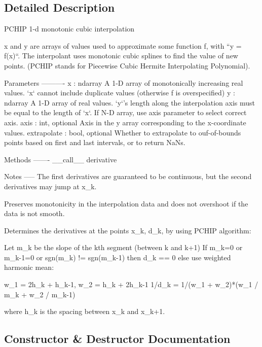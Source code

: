 \subsection{Detailed Description}
\begin{DoxyVerb}PCHIP 1-d monotonic cubic interpolation

x and y are arrays of values used to approximate some function f,
with ``y = f(x)``.  The interpolant uses monotonic cubic splines
to find the value of new points. (PCHIP stands for Piecewise Cubic
Hermite Interpolating Polynomial).

Parameters
----------
x : ndarray
    A 1-D array of monotonically increasing real values.  `x` cannot
    include duplicate values (otherwise f is overspecified)
y : ndarray
    A 1-D array of real values.  `y`'s length along the interpolation
    axis must be equal to the length of `x`. If N-D array, use axis 
    parameter to select correct axis.
axis : int, optional
    Axis in the y array corresponding to the x-coordinate values.
extrapolate : bool, optional
    Whether to extrapolate to ouf-of-bounds points based on first
    and last intervals, or to return NaNs.

Methods
-------
__call__
derivative

Notes
-----
The first derivatives are guaranteed to be continuous, but the second
derivatives may jump at x_k. 

Preserves monotonicity in the interpolation data and does not overshoot
if the data is not smooth.

Determines the derivatives at the points x_k, d_k, by using PCHIP algorithm:
  
Let m_k be the slope of the kth segment (between k and k+1)
If m_k=0 or m_{k-1}=0 or sgn(m_k) != sgn(m_{k-1}) then d_k == 0
else use weighted harmonic mean:

   w_1 = 2h_k + h_{k-1}, w_2 = h_k + 2h_{k-1}
   1/d_k = 1/(w_1 + w_2)*(w_1 / m_k + w_2 / m_{k-1})

where h_k is the spacing between x_k and x_{k+1}.\end{DoxyVerb}
 

\subsection{Constructor \& Destructor Documentation}
\hypertarget{classscipy_1_1interpolate_1_1__monotone_1_1PchipInterpolator_a6b4721e0d8d26176ef866745f25f5b7c}{}
